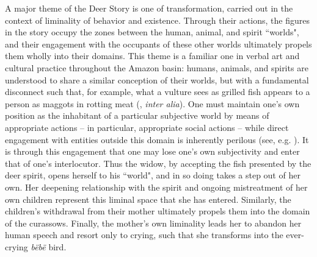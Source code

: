 \documentclass[output=paper,
modfonts,nonflat
]{langsci/langscibook}
\begin{document}
	A major theme of the Deer Story is one of transformation, carried out in the context of liminality of behavior and existence. Through their actions, the figures in the story occupy the zones between the human, animal, and spirit “worlds", and their engagement with the occupants of these other worlds ultimately propels them wholly into their domains. This theme is a familiar one in verbal art and cultural practice throughout the Amazon basin: humans, animals, and spirits are understood to share a similar conception of their worlds, but with a fundamental disconnect such that, for example, what a vulture sees as grilled fish appears to a person as maggots in rotting meat (\citealt{ViveirosdeCastro1998}, \textit{inter alia}). One must maintain one’s own position as the inhabitant of a particular subjective world by means of appropriate actions – in particular, appropriate social actions – while direct engagement with entities outside this domain is inherently perilous (see, e.g. \citealt{Santos-Granero2006,LondoñoSulkin2005,Uzendowski2005,Vilaça2000}). It is through this engagement that one may lose one’s own subjectivity and enter that of one’s interlocutor. Thus the widow, by accepting the fish presented by the deer spirit, opens herself to his “world", and in so doing takes a step out of her own. Her deepening relationship with the spirit and ongoing mistreatment of her own children represent this liminal space that she has entered. Similarly, the children’s withdrawal from their mother ultimately propels them into the domain of the curassows. Finally, the mother’s own liminality leads her to abandon her human speech and resort only to crying, such that she transforms into the ever-crying \textit{bëbë} bird.
    
\end{document}
